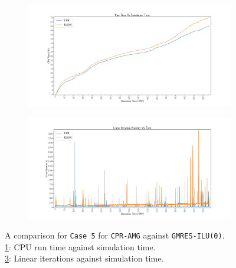 \begin{figure}
\centering
\begin{subfigure}[b]{\textwidth}
   \includegraphics[width=1\linewidth]{figures/case9/cpu_time.pdf}
   \caption{}
   \label{case5_cpu}
\end{subfigure}

\begin{subfigure}[b]{\textwidth}
   \includegraphics[width=1\linewidth]{figures/case9/its_time.pdf}
   \caption{}
   \label{case5_its}
\end{subfigure}

\caption[caption]{A comparison for \texttt{Case 5} for \texttt{CPR-AMG} against \texttt{GMRES-ILU(0)}.\\\hspace{\textwidth}
	\cref{case5_cpu}: CPU run time against simulation time. \\\hspace{\textwidth}
	\cref{case5_its}: Linear iterations against simulation time.\\\hspace{\textwidth}}
\end{figure}

